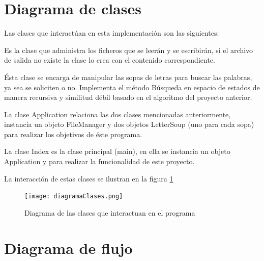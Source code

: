 \documentclass[letterpaper,12pt]{report}
\begin{document}
\section{Diagrama de clases}

Las clases que interactúan en esta implementación son las siguientes:

\begin{description}[align=left]
\item [FileManager:]
	Es la clase que administra los ficheros que se leerán y se escribirán, si el archivo de salida no existe la clase lo crea con el contenido correspondiente.
\item [LetterSoup:]
	Ésta clase se encarga de manipular las sopas de letras para buscar las palabras, ya sea se soliciten o no. Implementa el método Búsqueda en espacio de estados de manera recursiva y similitud débil basado en el algoritmo del proyecto anterior.
\item [Application:]
	La clase Application relaciona las dos clases mencionadas anteriormente, instancia un objeto FileManager y dos objetos LetterSoup (uno para cada sopa) para realizar los objetivos de éste programa.
\item [Index:] 
	La clase Index es la clase principal (main), en ella se instancia un objeto Application y para realizar la funcionalidad de este proyecto.
\end{description}

La interacción de estas clases se ilustran en la figura \ref{fig:diagramaClases}

\begin{figure}[h]
    \centering
    \texttt{[image: diagramaClases.png]}
    \caption{Diagrama de las clases que interactuan en el programa}
    \label{fig:diagramaClases}
\end{figure}

\section{Diagrama de flujo}
\end{document}

